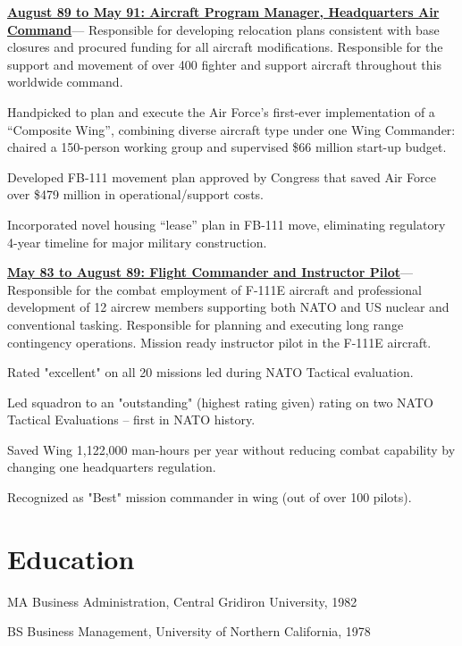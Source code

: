 \documentclass[10pt,letterpaper]{article}
\newenvironment{accomplishments}{%
	\begin{list}{\textbullet}{%
        \setlength\leftmargin{1em}      %
        \setlength\topsep{0ex}          %
        \setlength\parskip{0.5ex}
        \setstretch{0.8}
        \setlength\listparindent{1em}   %
        \setlength\parsep{0in}          %
        \setlength\itemsep{0.5ex}         %
        }
}{
	\end{list}
}
\newcommand{\accomplishment}{\item }
\newenvironment{job}[4]{%
\vspace{0.0em}
\noindent\textbf{\underline{{#1: #2\ifthenelse{\isempty{#3}}{}{, #3}}}}---#4%
\noindent\begin{accomplishments}{}
}{
\end{accomplishments}
\vspace{1.5em}
}
\newenvironment{degree}[4]{%
\par\noindent#1, #3, #2
}{
\vspace{0.0ex}
}
\begin{document}
\begin{job}{August 89 to May 91}{Aircraft Program Manager, Headquarters Air Command}{}{%
Responsible for developing relocation plans
consistent with base closures and procured funding for all aircraft modifications. Responsible for the support and movement of over
400 fighter and support aircraft throughout this worldwide command.
}
\accomplishment Handpicked to plan and execute the Air Force’s first-ever implementation of a “Composite Wing”, combining diverse aircraft type
under one Wing Commander: chaired a 150-person working group and supervised \$66 million start-up budget.
\accomplishment Developed FB-111 movement plan approved by Congress that saved Air Force over \$479 million in operational/support costs.
\accomplishment Incorporated novel housing “lease” plan in FB-111 move, eliminating regulatory 4-year timeline for major military construction.
\end{job}

\begin{job}{May 83 to August 89}{Flight Commander and Instructor Pilot}{}{%
Responsible for the combat employment of F-111E aircraft and
professional development of 12 aircrew members supporting both NATO and US nuclear and conventional tasking. Responsible for
planning and executing long range contingency operations. Mission ready instructor pilot in the F-111E aircraft.
}
\accomplishment Rated "excellent" on all 20 missions led during NATO Tactical evaluation.
\accomplishment Led squadron to an "outstanding" (highest rating given) rating on two NATO Tactical Evaluations – first in NATO history.
\accomplishment Saved Wing 1,122,000 man-hours per year without reducing combat capability by changing one headquarters regulation.
\accomplishment Recognized as "Best" mission commander in wing (out of over 100 pilots).
\end{job}


\section*{Education}

\begin{degree}{MA Business Administration}{1982}{Central Gridiron University}{Seol, South Korea}\end{degree}
\begin{degree}{BS Business Management}{1978}{University of Northern California}{Santa Rosa, CA}\end{degree}
\end{document}
